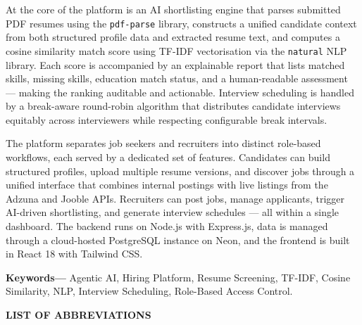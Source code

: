 \documentclass[12pt,a4paper]{report}
\renewcommand{\headrulewidth}{0.4pt}
\renewcommand{\footrulewidth}{0.4pt}
\renewcommand{\headrulewidth}{0pt}
\renewcommand{\footrulewidth}{0.4pt}
\begin{document}
\vspace{0.3cm}
\noindent
At the core of the platform is an AI shortlisting engine that parses submitted PDF resumes using the \texttt{pdf-parse} library, constructs a unified candidate context from both structured profile data and extracted resume text, and computes a cosine similarity match score using TF-IDF vectorisation via the \texttt{natural} NLP library. Each score is accompanied by an explainable report that lists matched skills, missing skills, education match status, and a human-readable assessment — making the ranking auditable and actionable. Interview scheduling is handled by a break-aware round-robin algorithm that distributes candidate interviews equitably across interviewers while respecting configurable break intervals.

\vspace{0.3cm}
\noindent
The platform separates job seekers and recruiters into distinct role-based workflows, each served by a dedicated set of features. Candidates can build structured profiles, upload multiple resume versions, and discover jobs through a unified interface that combines internal postings with live listings from the Adzuna and Jooble APIs. Recruiters can post jobs, manage applicants, trigger AI-driven shortlisting, and generate interview schedules — all within a single dashboard. The backend runs on Node.js with Express.js, data is managed through a cloud-hosted PostgreSQL instance on Neon, and the frontend is built in React 18 with Tailwind CSS.

\vspace{0.3cm}
\noindent
\textbf{Keywords---} Agentic AI, Hiring Platform, Resume Screening, TF-IDF, Cosine Similarity, NLP, Interview Scheduling, Role-Based Access Control.
\clearpage

\clearpage
\pagestyle{fancy}
\fancyhf{}
\fancyfoot[C]{\thepage}
\renewcommand{\headrulewidth}{0pt}
\renewcommand{\footrulewidth}{0.4pt}
\tableofcontents
\clearpage
{}
\listoffigures
\clearpage
{}
\listoftables
\clearpage

\begin{center}
    {\large\bfseries LIST OF ABBREVIATIONS}
\end{center}
\vspace{0.5cm}
\end{document}
